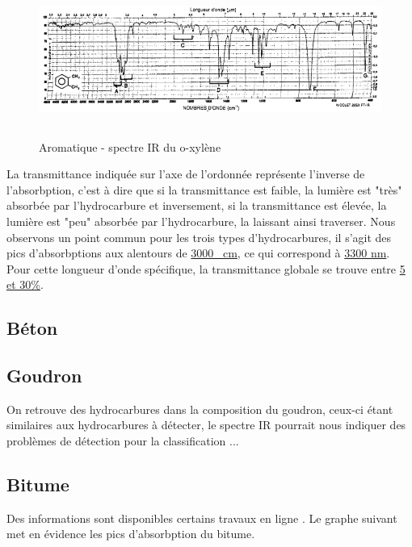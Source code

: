 \begin{figure}[H]
    \centering
    \includegraphics[height=5cm,angle=90]{assets/figures/aromatique.png}
    \caption{Aromatique - spectre IR du o-xylène \cite{Hydrocarbures}}
\end{figure}

\newpage
La transmittance indiquée sur l'axe de l'ordonnée représente l'inverse de l'absorbption, c'est à dire que si la transmittance est faible, la lumière
est "très" absorbée par l'hydrocarbure et inversement, si la transmittance est élevée, la lumière est "peu" absorbée par l'hydrocarbure, la laissant ainsi traverser.
Nous observons un point commun pour les trois types d'hydrocarbures, il s'agit des pics d'absorbptions aux alentours de \underline{3000 \si{\per\centi\metre}}, ce qui correspond à \underline{3300 \si{\nano\metre}}.\\
Pour cette longueur d'onde spécifique, la transmittance globale se trouve entre \underline{5 et 30\%}.

\subsection{Béton}

\subsection{Goudron}
On retrouve des hydrocarbures dans la composition du goudron, ceux-ci étant similaires aux hydrocarbures à détecter, le spectre IR pourrait nous indiquer des problèmes de détection pour la classification ...

\subsection{Bitume}
Des informations sont disponibles certains travaux en ligne \cite{Bitume}. Le graphe suivant met en évidence les pics d'absorbption du bitume.

